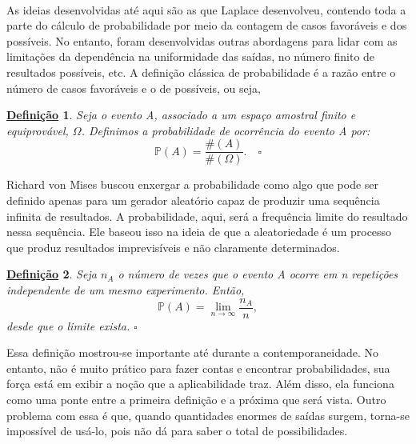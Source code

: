 \documentclass{article}
\newtheorem*{def*}{\underline{Defini\c c\~ao}}
\begin{document}
\paragraph{}As ideias desenvolvidas até aqui são as que Laplace desenvolveu, contendo toda a parte do cálculo
de probabilidade por meio da contagem de casos favoráveis e dos possíveis. No entanto, foram desenvolvidas outras
abordagens para lidar com as limitações da dependência na uniformidade das saídas, no número finito de resultados possíveis, etc.
A definição clássica de probabilidade é a razão entre o número de casos favoráveis e o de possíveis, ou seja, 
\begin{def*}
  Seja o evento A, associado a um espaço amostral finito e equiprovável, \(\Omega \). Definimos a probabilidade de ocorrência do evento A por: 
  \[
    \mathbb{P}(A) = \frac{\#(A)}{\#(\Omega )}.\quad \square
  \]
\end{def*}
Richard von Mises buscou enxergar a probabilidade como algo que pode ser definido apenas para um gerador aleatório capaz de produzir uma sequência infinita de resultados.
A probabilidade, aqui, será a frequência limite do resultado nessa sequência. Ele baseou isso na ideia de que a aleatoriedade é um processo que produz resultados imprevisíveis
e não claramente determinados.
\begin{def*}
  Seja \(n_{A}\) o número de vezes que o evento A ocorre em n repetições independente de um mesmo experimento. Então, 
  \[
    \mathbb{P}(A) = \lim_{n\to \infty}\frac{n_{A}}{n},
  \]
  desde que o limite exista. \(\square\)
\end{def*}
Essa definição mostrou-se importante até durante a contemporaneidade. No entanto, não é muito prático para fazer contas e encontrar probabilidades, 
sua força está em exibir a noção que a aplicabilidade traz. Além disso, ela funciona como uma ponte entre a primeira definição e a próxima que será vista.
Outro problema com essa é que, quando quantidades enormes de saídas surgem, torna-se impossível de usá-lo, pois não dá para saber o total de possibilidades.
\end{document}
